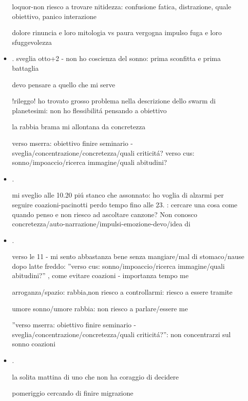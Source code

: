 \begin{itemize}
loquor-non riesco a trovare nitidezza: confusione fatica, distrazione, quale obiettivo, panico interazione

dolore rinuncia e loro mitologia vs paura vergogna impulso fuga e loro sfuggevolezza

\item {}.
sveglia otto+2 - non ho coscienza del sonno: prima sconfitta e prima battaglia

devo pensare a quello che mi serve

!rileggo!
ho trovato grosso problema nella descrizione dello swarm di planetesimi: non ho flessibilit\'a pensando a obiettivo

la rabbia brama mi allontana da concretezza

verso mserra: obiettivo finire seminario - sveglia/concentrazione/concretezza/quali criticit\'a?
verso cus: sonno/impoaccio/ricerca immagine/quali abitudini?

\item {}.

mi sveglio alle 10.20 pi\'u stanco che assonnato: ho voglia di alzarmi per seguire coazioni-pacinotti perdo tempo fino alle 23.
: cercare una cosa come quando penso e non riesco ad ascoltare canzone?
Non conosco concretezza/auto-narrazione/impulsi-emozione-devo/idea di 

\item {}.

verso le 11 - mi sento abbastanza bene senza mangiare/mal di stomaco/nause dopo latte freddo: ''verso cus: sonno/impoaccio/ricerca immagine/quali abitudini?'' , come evitare coazioni - importanza tempo me

arroganza/spazio: rabbia,non riesco a controllarmi: riesco a essere tramite 

umore sonno/umore rabbia: non riesco a parlare/essere me

''verso mserra: obiettivo finire seminario - sveglia/concentrazione/concretezza/quali criticit\'a?'': non concentrarzi sul sonno coazioni

\item {}.

la solita mattina di uno che non ha coraggio di decidere

pomeriggio cercando di finire migrazione


\end{itemize}
